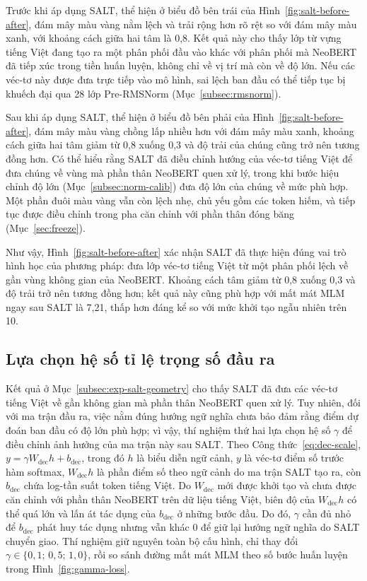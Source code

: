 Trước khi áp dụng SALT, thể hiện ở biểu đồ bên trái của
Hình~\ref{fig:salt-before-after}, đám mây màu vàng nằm lệch và trải rộng hơn rõ rệt so với
đám mây màu xanh, với khoảng cách giữa hai tâm là 0,8. Kết quả này cho thấy lớp từ vựng
tiếng Việt đang tạo ra một phân phối đầu vào khác với phân phối mà NeoBERT đã tiếp xúc
trong tiền huấn luyện, không chỉ về vị trí mà còn về độ lớn. Nếu các véc-tơ này được đưa
trực tiếp vào mô hình, sai lệch ban đầu có thể tiếp tục bị khuếch đại qua 28 lớp
Pre-RMSNorm (Mục~\ref{subsec:rmsnorm}).

Sau khi áp dụng SALT, thể hiện ở biểu đồ bên phải của
Hình~\ref{fig:salt-before-after}, đám mây màu vàng chồng lấp nhiều hơn với đám mây màu
xanh, khoảng cách giữa hai tâm giảm từ 0,8 xuống 0,3 và độ trải của chúng cũng trở nên
tương đồng hơn. Có thể hiểu rằng SALT đã điều chỉnh hướng của véc-tơ tiếng Việt để đưa
chúng về vùng mà phần thân NeoBERT quen xử lý, trong khi bước hiệu chỉnh độ lớn
(Mục~\ref{subsec:norm-calib}) đưa độ lớn của chúng về mức phù hợp. Một phần đuôi màu vàng
vẫn còn lệch nhẹ, chủ yếu gồm các token hiếm, và tiếp tục được điều chỉnh trong pha căn
chỉnh với phần thân đóng băng (Mục~\ref{sec:freeze}).

Như vậy, Hình~\ref{fig:salt-before-after} xác nhận SALT đã thực hiện đúng vai trò hình học
của phương pháp: đưa lớp véc-tơ tiếng Việt từ một phân phối lệch về gần vùng không gian
của NeoBERT. Khoảng cách tâm giảm từ 0,8 xuống 0,3 và độ trải trở nên tương đồng hơn; kết
quả này cũng phù hợp với mất mát MLM ngay sau SALT là 7,21, thấp hơn đáng kể so với mức
khởi tạo ngẫu nhiên trên 10.

\subsection{Lựa chọn hệ số tỉ lệ trọng số đầu ra}
\label{subsec:exp-gamma}

Kết quả ở Mục~\ref{subsec:exp-salt-geometry} cho thấy SALT đã đưa các véc-tơ tiếng Việt
về gần không gian mà phần thân NeoBERT quen xử lý. Tuy nhiên, đối với ma trận đầu ra,
việc nằm đúng hướng ngữ nghĩa chưa bảo đảm rằng điểm dự đoán ban đầu có độ lớn phù hợp;
vì vậy, thí nghiệm thứ hai lựa chọn hệ số $\gamma$ để điều chỉnh ảnh hưởng của ma trận
này sau SALT. Theo Công thức~\eqref{eq:dec-scale},
$y = \gamma W_{\mathrm{dec}}h + b_{\mathrm{dec}}$, trong đó $h$ là biểu diễn ngữ cảnh,
$y$ là véc-tơ điểm số trước hàm softmax, $W_{\mathrm{dec}}h$ là phần điểm số theo ngữ
cảnh do ma trận SALT tạo ra, còn $b_{\mathrm{dec}}$ chứa log-tần suất token tiếng Việt.
Do $W_{\mathrm{dec}}$ mới được khởi tạo và chưa được căn chỉnh với phần thân NeoBERT
trên dữ liệu tiếng Việt, biên độ của $W_{\mathrm{dec}}h$ có thể quá lớn và lấn át tác
dụng của $b_{\mathrm{dec}}$ ở những bước đầu. Do đó, $\gamma$ cần đủ nhỏ để
$b_{\mathrm{dec}}$ phát huy tác dụng nhưng vẫn khác 0 để giữ lại hướng ngữ nghĩa do SALT
chuyển giao. Thí nghiệm giữ nguyên toàn bộ cấu hình, chỉ thay đổi
$\gamma \in \{0{,}1;\,0{,}5;\,1{,}0\}$, rồi so sánh đường mất mát MLM theo số bước huấn
luyện trong Hình~\ref{fig:gamma-loss}.

